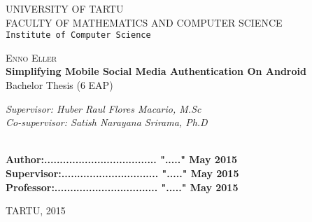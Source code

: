 \begin{titlepage}

\begin{center}



\textsc{UNIVERSITY OF TARTU}\\

\textsc{FACULTY OF MATHEMATICS AND COMPUTER SCIENCE}\\

\texttt{Institute of Computer Science}\\

\vspace{3 cm}


\textsc{ \large Enno Eller}\\[0.5cm]
{ \Huge \bfseries Simplifying Mobile Social Media Authentication On Android}\\[0.5cm]
{\large Bachelor Thesis (6 EAP)}\\[3cm]



\begin{minipage}{0.8\textwidth}
\begin{flushright} \large
\emph{Supervisor: Huber Raul Flores Macario, M.Sc}  \\	  %
\emph{Co-supervisor: Satish Narayana Srirama, Ph.D}  %
\end{flushright}
\end{minipage}

\textbf{}\\[1.0cm]

\textbf{Author:.................................... "....." May   2015}\\[0.5cm]

\textbf{Supervisor:............................... "....." May   2015}\\[0.5cm]

\textbf{Professor:................................. "....." May   2015}\\[0.5cm]        

\vfill

{\large TARTU, 2015}

\end{center}

\end{titlepage}
